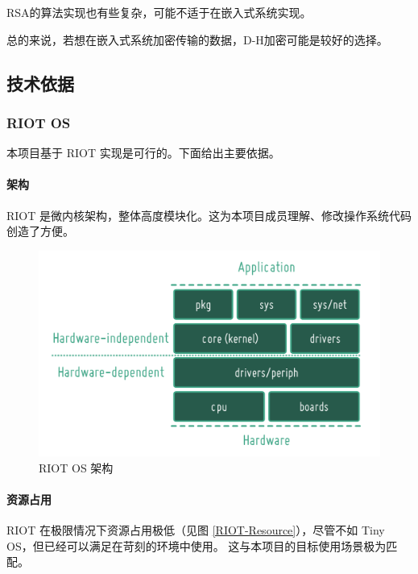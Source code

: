 \documentclass{ctexart}
\begin{document}
RSA的算法实现也有些复杂，可能不适于在嵌入式系统实现。

总的来说，若想在嵌入式系统加密传输的数据，D-H加密可能是较好的选择。
\subsection{技术依据}
\subsubsection{RIOT OS}
本项目基于 RIOT 实现是可行的。下面给出主要依据。

\paragraph{架构}
RIOT 是微内核架构，整体高度模块化。这为本项目成员理解、修改操作系统代码创造了方便。

\begin{figure}
	\includegraphics[width=\textwidth]{RIOT-Overview.png}
	\caption{RIOT OS 架构}
	\label{RIOT-Overview}
\end{figure}

\paragraph{资源占用}
RIOT 在极限情况下资源占用极低（见图 \ref{RIOT-Resource}），尽管不如 Tiny OS，但已经可以满足在苛刻的环境中使用。
这与本项目的目标使用场景极为匹配。
\end{document}
